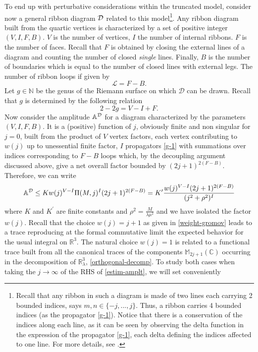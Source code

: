 \documentclass[a4paper,11pt,twoside]{article}
\numberwithin{equation}{section}
\theoremstyle{nonumberplain}
\newcounter{and}
\begin{document}
To end up with perturbative considerations within the truncated model, consider now a general ribbon diagram ${\cal{D}}$ related to this model{\footnote{Recall that any ribbon in such a diagram is made of two lines each carrying 2 bounded indices, says $m,n\in\{-j,...,j \}$. Thus, a ribbon carries 4 bounded indices (as the propagator \eqref{g-1}). Notice that there is a conservation of the indices along each line, as it can be seen by observing the delta function in the expression of the propagator \eqref{g-1}, each delta defining the indices affected to one line. For more details, see \cite{vit-wal-12}.}}. Any ribbon diagram built from the quartic vertices is characterized by a set of positive integer $(V,I,F,B)$. $V$ is the number of vertices, $I$ the number of internal ribbons. $F$ is the number of faces. Recall that $F$ is obtained by closing the external lines of a diagram and counting the number of closed {\it{single}} lines. Finally, $B$ is the number of boundaries which is equal to the number of closed lines with external legs. The number of ribbon loops if given by
\begin{equation}
\mathcal{L}=F-B \label{loops-number}.
\end{equation}
Let $g\in\mathbb{N}$ be the genus of the Riemann surface on which $\mathcal{D}$ can be drawn. Recall that $g$ is determined by the following relation
\begin{equation}
2-2g=V-I+F \label{euler}.
\end{equation}
Now consider the amplitude ${\mathbb{A}}^{\cal{D}}$ for a diagram characterized by the parameters $(V,I,F,B)$. It is a (positive) function of $j$, obviously finite and non singular for $j=0$, built from the product of $V$ vertex factors, each vertex contributing to $w(j)$ up to unessential finite factor, $I$ propagators \eqref{g-1} with summations over indices corresponding to $F-B$ loops which, by the decoupling argument discussed above, give a net overall factor bounded by $(2j+1)^{2(F-B)}$. Therefore, we can write
\begin{equation}
{\mathbb{A}}^{\cal{D}}\le Kw(j)^{V-I}\Pi(M,j)^{I}(2j+1)^{2(F-B)}=K^\prime\frac{w(j)^{V-I}(2j+1)^{2(F-B)}}{(j^2+\rho^2)^I}\label{estim-amplt}
\end{equation}
where $K$ and $K^\prime$ are finite constants and $\rho^2=\frac{M}{\lambda\mu^2}$ and we have isolated the factor $w(j)$. Recall that the choice $w(j)=j+1$ as given in \eqref{weight-gromov} leads to a trace reproducing at the formal commutative limit the expected behavior for the usual integral on $\mathbb{R}^3$. The natural choice $w(j)=1$ is related to a functional trace built from all the canonical traces of the components $\mathbb{M}_{2j+1}(\mathbb{C})$ occurring in the decomposition of $\mathbb{R}^3_\lambda$, \eqref{orthogonal-decomp}. To study both cases when taking the $j\to\infty$ of the RHS of \eqref{estim-amplt}, we will set conveniently
\end{document}

